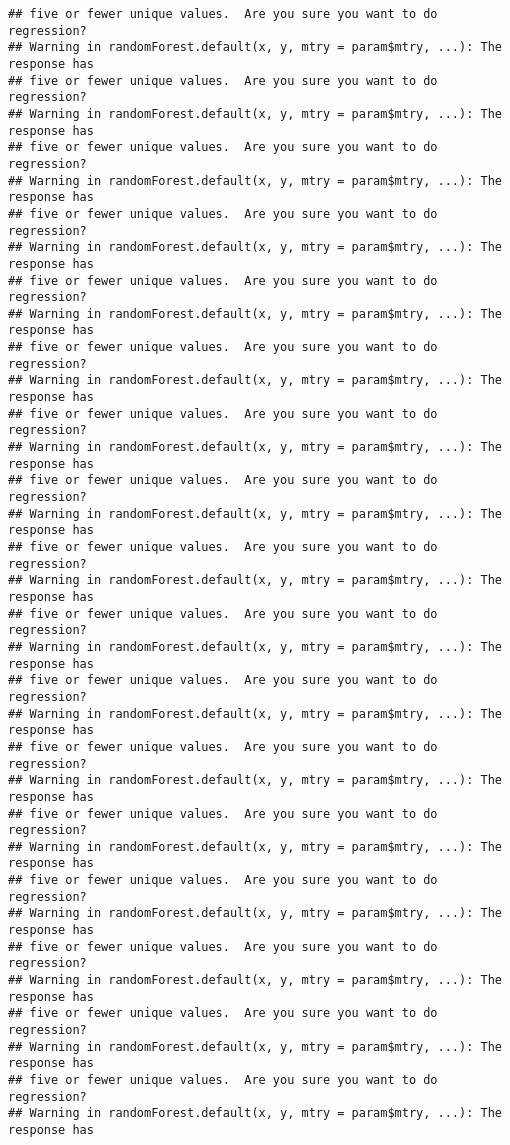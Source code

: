 \documentclass[
]{article}
\begin{document}
\begin{verbatim}
## five or fewer unique values.  Are you sure you want to do regression?
## Warning in randomForest.default(x, y, mtry = param$mtry, ...): The response has
## five or fewer unique values.  Are you sure you want to do regression?
## Warning in randomForest.default(x, y, mtry = param$mtry, ...): The response has
## five or fewer unique values.  Are you sure you want to do regression?
## Warning in randomForest.default(x, y, mtry = param$mtry, ...): The response has
## five or fewer unique values.  Are you sure you want to do regression?
## Warning in randomForest.default(x, y, mtry = param$mtry, ...): The response has
## five or fewer unique values.  Are you sure you want to do regression?
## Warning in randomForest.default(x, y, mtry = param$mtry, ...): The response has
## five or fewer unique values.  Are you sure you want to do regression?
## Warning in randomForest.default(x, y, mtry = param$mtry, ...): The response has
## five or fewer unique values.  Are you sure you want to do regression?
## Warning in randomForest.default(x, y, mtry = param$mtry, ...): The response has
## five or fewer unique values.  Are you sure you want to do regression?
## Warning in randomForest.default(x, y, mtry = param$mtry, ...): The response has
## five or fewer unique values.  Are you sure you want to do regression?
## Warning in randomForest.default(x, y, mtry = param$mtry, ...): The response has
## five or fewer unique values.  Are you sure you want to do regression?
## Warning in randomForest.default(x, y, mtry = param$mtry, ...): The response has
## five or fewer unique values.  Are you sure you want to do regression?
## Warning in randomForest.default(x, y, mtry = param$mtry, ...): The response has
## five or fewer unique values.  Are you sure you want to do regression?
## Warning in randomForest.default(x, y, mtry = param$mtry, ...): The response has
## five or fewer unique values.  Are you sure you want to do regression?
## Warning in randomForest.default(x, y, mtry = param$mtry, ...): The response has
## five or fewer unique values.  Are you sure you want to do regression?
## Warning in randomForest.default(x, y, mtry = param$mtry, ...): The response has
## five or fewer unique values.  Are you sure you want to do regression?
## Warning in randomForest.default(x, y, mtry = param$mtry, ...): The response has
## five or fewer unique values.  Are you sure you want to do regression?
## Warning in randomForest.default(x, y, mtry = param$mtry, ...): The response has
## five or fewer unique values.  Are you sure you want to do regression?
## Warning in randomForest.default(x, y, mtry = param$mtry, ...): The response has

\end{verbatim}
\end{document}
